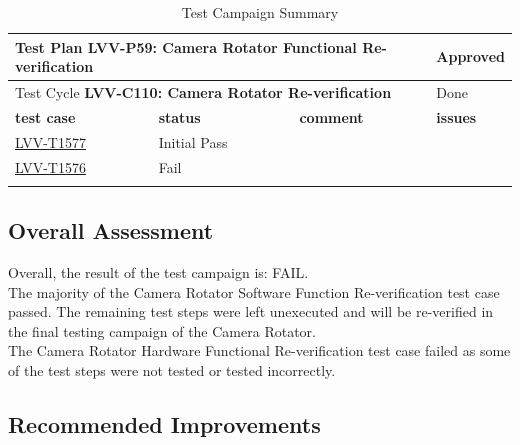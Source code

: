 \documentclass[SE,lsstdraft,STR,toc]{lsstdoc}
\begin{document}
\begin{longtable}{p{2cm}p{2.5cm}p{9cm}p{2.5cm}}
\toprule
\multicolumn{3}{l}{ Test Plan {\bf LVV-P59: Camera Rotator Functional Re-verification
 }} & Approved \\\hline

  \multicolumn{3}{l}{ Test Cycle {\bf LVV-C110: Camera Rotator Re-verification
 }} & Done \\\hline

  {\bf \footnotesize test case} & {\bf \footnotesize status} & {\bf \footnotesize comment} & {\bf \footnotesize issues} \\\toprule

    \href{https://jira.lsstcorp.org/secure/Tests.jspa#/testCase/LVV-T1577}{LVV-T1577}
    & Initial Pass &
    \begin{minipage}[]{9cm}
    \smallskip
    
    \medskip
    \end{minipage}
    &
    \\\hline
    \href{https://jira.lsstcorp.org/secure/Tests.jspa#/testCase/LVV-T1576}{LVV-T1576}
    & Fail &
    \begin{minipage}[]{9cm}
    \smallskip
    
    \medskip
    \end{minipage}
    &
    \\\hline
\caption{Test Campaign Summary}
\label{table:summary}
\end{longtable}

\subsection{Overall Assessment}
\label{sect:overallassessment}

Overall, the result of the test campaign is: FAIL.\\[2\baselineskip]The
majority of the Camera Rotator Software Function Re-verification test
case passed. The remaining test steps were left unexecuted and will be
re-verified in the final testing campaign of the Camera Rotator.\\
The Camera Rotator Hardware Functional Re-verification test case failed
as some of the test steps were not tested or tested incorrectly.~


\subsection{Recommended Improvements}
\label{sect:recommendations}
\end{document}
